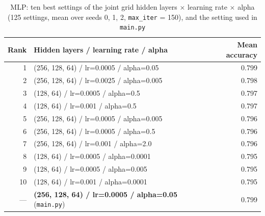 \begin{table}[!htb]
    \centering
    \caption{MLP: ten best settings of the joint grid hidden layers $\times$ learning rate $\times$ alpha (125 settings, mean over seeds 0, 1, 2, \texttt{max\_iter} = 150), and the setting used in \texttt{main.py}}
    \label{tab:grid_mlp}
    \small
    \begin{tabularx}{\textwidth}{@{} r X r @{}}
        \toprule
        \textbf{Rank} & \textbf{Hidden layers / learning rate / alpha} & \textbf{Mean accuracy} \\
        \midrule
        1 & (256, 128, 64) / lr=0.0005 / alpha=0.05 & 0.799 \\
        2 & (256, 128, 64) / lr=0.0025 / alpha=0.005 & 0.798 \\
        3 & (128, 64) / lr=0.0005 / alpha=0.5 & 0.797 \\
        4 & (128, 64) / lr=0.001 / alpha=0.5 & 0.797 \\
        5 & (256, 128, 64) / lr=0.0005 / alpha=0.005 & 0.796 \\
        6 & (256, 128, 64) / lr=0.0005 / alpha=0.5 & 0.796 \\
        7 & (256, 128, 64) / lr=0.001 / alpha=2.0 & 0.796 \\
        8 & (128, 64) / lr=0.0005 / alpha=0.0001 & 0.795 \\
        9 & (128, 64) / lr=0.0005 / alpha=0.005 & 0.795 \\
        10 & (128, 64) / lr=0.001 / alpha=0.0001 & 0.795 \\
        \midrule
        --- & \textbf{(256, 128, 64) / lr=0.0005 / alpha=0.05} (\texttt{main.py}) & 0.799 \\
        \bottomrule
    \end{tabularx}
\end{table}

